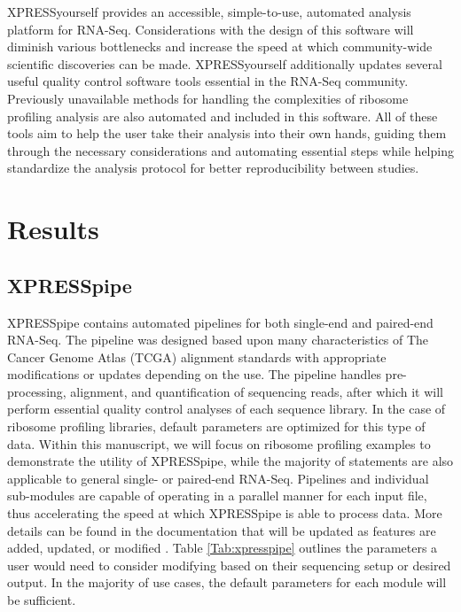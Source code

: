 \documentclass[10pt, oneside]{article}
\begin{document}
XPRESSyourself provides an accessible, simple-to-use, automated analysis platform for RNA-Seq. Considerations with the design of this software will diminish various bottlenecks and increase the speed at which community-wide scientific discoveries can be made. XPRESSyourself additionally updates several useful quality control software tools essential in the RNA-Seq community. Previously unavailable methods for handling the complexities of ribosome profiling analysis are also automated and included in this software. All of these tools aim to help the user take their analysis into their own hands, guiding them through the necessary considerations and automating essential steps while helping standardize the analysis protocol for better reproducibility between studies.


\section{Results}

\subsection{XPRESSpipe}
XPRESSpipe contains automated pipelines for both single-end and paired-end RNA-Seq. The pipeline was designed based upon many characteristics of The Cancer Genome Atlas (TCGA) \cite{tcga} alignment standards with appropriate modifications or updates depending on the use. The pipeline handles pre-processing, alignment, and quantification of sequencing reads, after which it will perform essential quality control analyses of each sequence library. In the case of ribosome profiling libraries, default parameters are optimized for this type of data. Within this manuscript, we will focus on ribosome profiling examples to demonstrate the utility of XPRESSpipe, while the majority of statements are also applicable to general single- or paired-end RNA-Seq. Pipelines and individual sub-modules are capable of operating in a parallel manner for each input file, thus accelerating the speed at which XPRESSpipe is able to process data. More details can be found in the documentation that will be updated as features are added, updated, or modified \cite{xpresspipe_docs}. Table \ref{Tab:xpresspipe} outlines the parameters a user would need to consider modifying based on their sequencing setup or desired output. In the majority of use cases, the default parameters for each module will be sufficient. \par
\end{document}
